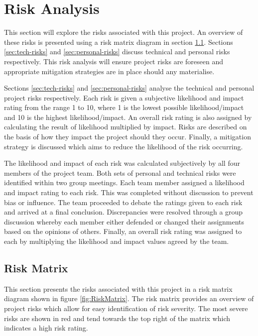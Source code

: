\documentclass[11pt,a4paper]{article}
\begin{document}
\section{Risk Analysis}
\label{sec:risk-analysis}

This section will explore the risks associated with this project. An overview of these risks is presented using a risk matrix diagram in section \ref{sec:risk-matrix}. Sections \ref{sec:tech-risks} and \ref{sec:personal-risks} discuss technical and personal risks respectively. This risk analysis will ensure project risks are foreseen and appropriate mitigation strategies are in place should any materialise.

Sections \ref{sec:tech-risks} and \ref{sec:personal-risks} analyse the technical and personal project risks respectively. Each risk is given a subjective likelihood and impact rating from the range 1 to 10, where 1 is the lowest possible likelihood/impact and 10 is the highest likelihood/impact. An overall risk rating is also assigned by calculating the result of likelihood multiplied by impact. Risks are described on the basis of how they impact the project should they occur. Finally, a mitigation strategy is discussed which aims to reduce the likelihood of the risk occurring.

The likelihood and impact of each risk was calculated subjectively by all four members of the project team. Both sets of personal and technical risks were identified within two group meetings. Each team member assigned a likelihood and impact rating to each risk. This was completed without discussion to prevent bias or influence. The team proceeded to debate the ratings given to each risk and arrived at a final conclusion. Discrepancies were resolved through a group discussion whereby each member either defended or changed their assignments based on the opinions of others. Finally, an overall risk rating was assigned to each by multiplying the likelihood and impact values agreed by the team.

\subsection{Risk Matrix}
\label{sec:risk-matrix}

This section presents the risks associated with this project in a risk matrix diagram shown in figure \ref{fig:RiskMatrix}. The risk matrix provides an overview of project risks which allow for easy identification of risk severity. The most severe risks are shown in red and tend towards the top right of the matrix which indicates a high risk rating.
\end{document}
